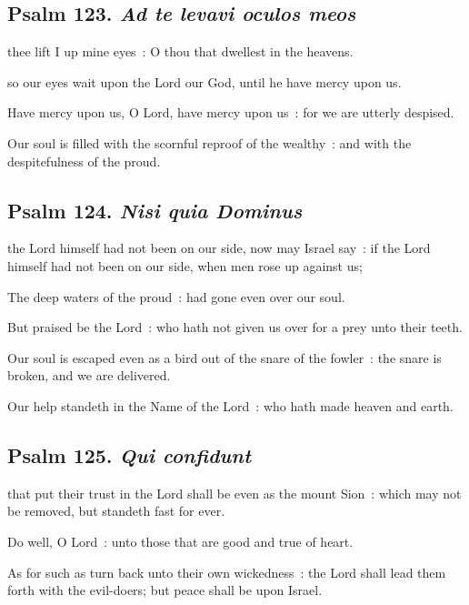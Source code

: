 \subsection{Psalm 123. \textit{Ad te levavi oculos meos}}

 thee lift I up mine eyes~: O thou that dwellest in the heavens.\par
\noindent
so our eyes wait upon the Lord our God, until he have mercy upon us.\par
{}Have mercy upon us, O Lord, have mercy upon us~: for we are utterly despised.\par
{}Our soul is filled with the scornful reproof of the wealthy~: and with the despitefulness of the proud.\par

\subsection{Psalm 124. \textit{Nisi quia Dominus}}

 the Lord himself had not been on our side, now may Israel say~: if the Lord himself had not been on our side, when men rose up against us;\par
{}
The deep waters of the proud~: had gone even over our soul.\par
{}But praised be the Lord~: who hath not given us over for a prey unto their teeth.\par
{}Our soul is escaped even as a bird out of the snare of the fowler~: the snare is broken, and we are delivered.\par
{}Our help standeth in the Name of the Lord~: who hath made heaven and earth.\par

\subsection{Psalm 125. \textit{Qui confidunt}}

 that put their trust in the Lord shall be even as the mount Sion~: which may not be removed, but standeth fast for ever.\par
{}
Do well, O Lord~: unto those that are good and true of heart.\par
{}As for such as turn back unto their own wickedness~: the Lord shall lead them forth with the evil-doers; but peace shall be upon Israel.\par

